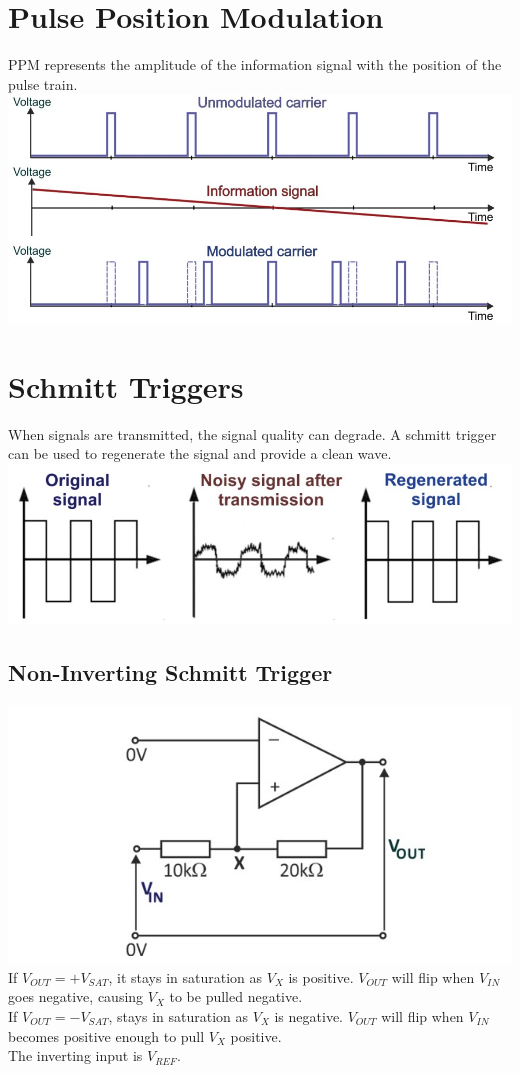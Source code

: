 \documentclass[a4paper,11pt, twocolumn]{article}
\begin{document}
\section{Pulse Position Modulation}
PPM represents the amplitude of the information signal with the position of the pulse train.
\includegraphics[width=\linewidth]{ppm.jpg}

\section{Schmitt Triggers}
When signals are transmitted, the signal quality can degrade. A schmitt trigger can be used to regenerate the signal and provide a clean wave.
\includegraphics[width=\linewidth]{schmittPurpose.jpg}
\subsection{Non-Inverting Schmitt Trigger}
\includegraphics[width=\linewidth]{niSchmitt.jpg}
If $V_{OUT} = +V_{SAT}$, it stays in saturation as $V_X$ is positive. $V_{OUT}$ will flip when $V_{IN}$ goes negative, causing $V_X$ to be pulled negative.\\
If $V_{OUT} = -V_{SAT}$, stays in saturation as $V_X$ is negative. $V_{OUT}$ will flip when $V_{IN}$ becomes positive enough to pull $V_X$ positive.\\
The inverting input is $V_{REF}$.
\end{document}
